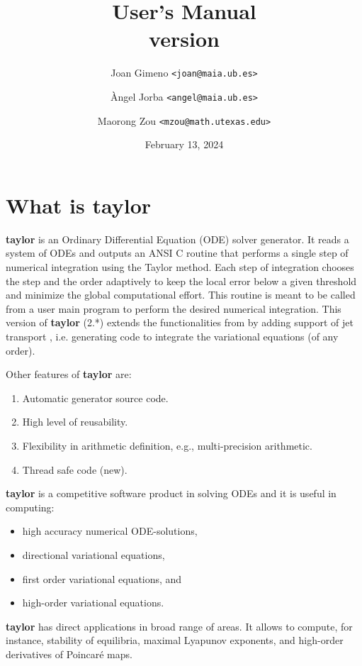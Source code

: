 \documentclass[10pt]{article}
\title{\vspace{-3em}\taylorname{} User's Manual\\[.5em] \normalsize version \version{}}
\author{%
Joan Gimeno {\tt <joan@maia.ub.es>} \and %
\`Angel Jorba {\tt <angel@maia.ub.es>} \and %
Maorong Zou {\tt <mzou@math.utexas.edu>}}
\date{February 13, 2024} %
\theoremstyle{remark}
\newcommand{\taylorname}{{\bf taylor}}
\begin{document}
\maketitle
\vspace{-4em}\tableofcontents \newpage %

\section{What is \taylorname{}} \label{sec:whatis}
\taylorname{} is an Ordinary Differential Equation (ODE) solver
generator.  It reads a system of ODEs and outputs an ANSI C routine
that performs a single step of numerical integration using the Taylor
method. Each step of integration chooses the step and the order
adaptively to keep the local error below a given threshold and
minimize the global computational effort.  This routine is meant to be
called from a user main program to perform the desired numerical
integration. This version of \taylorname{} (2.*) extends the
functionalities from \cite{JZ} by adding support of jet transport
\cite{GJJMZ}, i.e. generating code to integrate the variational
equations (of any order).

\smallskip 

Other features of \taylorname{} are:
\begin{enumerate}
\renewcommand{\theenumi}{\roman{enumi}}
    \item Automatic generator source code.
    \item High level of reusability.
    \item Flexibility in arithmetic definition, e.g.,
      multi-precision arithmetic.
    \item Thread safe code ({\sc new}).
\end{enumerate}
\taylorname{} is a competitive software product in solving ODEs and it
is useful in computing:
\begin{itemize}
    \item high accuracy numerical ODE-solutions,
    \item directional variational equations,
    \item first order variational equations, and
    \item high-order variational equations.
\end{itemize}
\taylorname{} has direct applications in broad range of areas.  It
allows to compute, for instance, stability of equilibria, maximal
Lyapunov exponents, and high-order derivatives of Poincar\'e maps.
\end{document}
